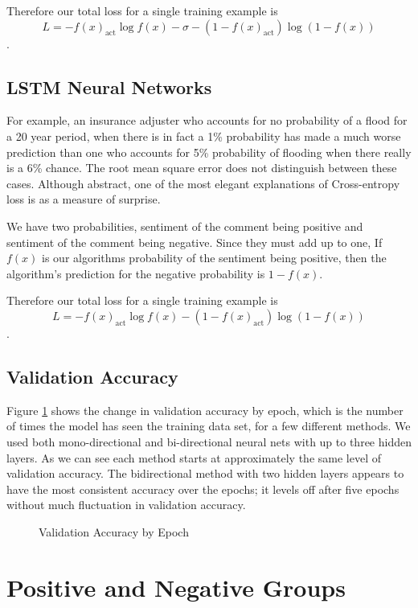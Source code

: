 \documentclass[titlepage,letterpaper]{article}
\begin{document}
Therefore our total loss for a single training example is
\[L = - f(x)_\text{act} \log f(x) -\sigma -(1-f(x)_\text{act}) \log (1-f(x))\].

\subsection{LSTM Neural Networks} \label{lstm_sec}

For example, an insurance adjuster who accounts for no probability of a flood for a 20 year period, when there is in fact a 1\% probability has made a much worse prediction than one who accounts for 5\% probability of flooding when there really is a 6\% chance. The root mean square error does not distinguish between these cases. Although abstract, one of the most elegant explanations of Cross-entropy loss is as a measure of surprise. \cite{NeuralNet}
 
We have two  probabilities, sentiment of the comment being positive and sentiment of the comment being negative. Since they must add up to one, If \(f(x)\) is our algorithms probability of the sentiment being positive, then the algorithm's prediction for the negative probability is \(1-f(x)\).

Therefore our total loss for a single training example is
\[L = - f(x)_\text{act} \log f(x)  - (1-f(x)_\text{act}) \log (1-f(x))\].


\subsection{Validation Accuracy}
Figure \ref{valepoch} shows the change in validation accuracy by epoch, which is the number of times the model has seen the training data set, for a few different methods. We used both mono-directional and bi-directional neural nets with up to three hidden layers. As we can see each method starts at approximately the same level of validation accuracy. The bidirectional method with two hidden layers appears to have the most consistent accuracy over the epochs; it levels off after five epochs without much fluctuation in validation accuracy. 

\begin{figure}[htb]
	\centering
	\caption{Validation Accuracy by Epoch}
	\resizebox{4in}{!}{}
	\label{valepoch}
\end{figure}

\section{Positive and Negative Groups}
\end{document}
